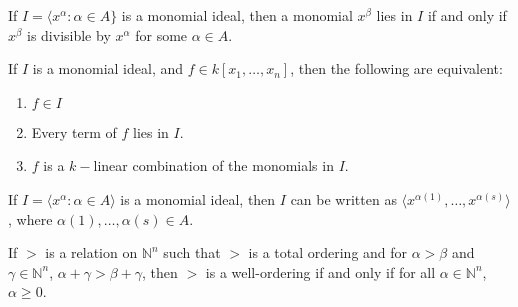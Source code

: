                 \begin{theorem}
                    If $I=\langle x^\alpha: \alpha \in A\}$ is
                    a monomial ideal, then a monomial $x^\beta$ lies
                    in $I$ if and only if $x^\beta$ is divisible by
                    $x^\alpha$ for some $\alpha \in A$.
                \end{theorem}
                \begin{theorem}
                    If $I$ is a monomial ideal, and
                    $f\in{k}[x_{1},\hdots,x_{n}]$, then
                    the following are equivalent:
                    \begin{enumerate}
                            \item $f\in I$
                            \item Every term of $f$ lies in $I$.
                            \item $f$ is a $k-$linear combination
                                  of the monomials in $I$.
                    \end{enumerate}
                \end{theorem}
                \begin{theorem}
                    If $I=\langle{x}^{\alpha}:\alpha\in{A}\rangle$
                    is a monomial ideal, then $I$ can be written as
                    $\langle{x}^{\alpha(1)},\hdots,x^{\alpha(s)}\rangle$,
                    where $\alpha(1),\hdots,\alpha(s)\in{A}$. 
                \end{theorem}
                \begin{theorem}
                    If $>$ is a relation on $\mathbb{N}^n$
                    such that $>$ is a total ordering and for
                    $\alpha>\beta$ and $\gamma\in\mathbb{N}^n$,
                    $\alpha+\gamma>\beta+\gamma$, then $>$ is a
                    well-ordering if and only if for all
                    $\alpha\in\mathbb{N}^n$, $\alpha\geq{0}$.
                \end{theorem}
